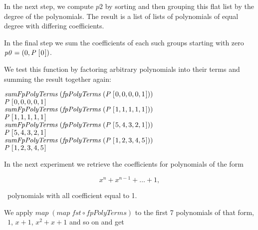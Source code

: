 \documentclass[tikz]{scrreprt}
\newcommand{\Conid}[1]{\mathit{#1}}
\newcommand{\Varid}[1]{\mathit{#1}}
\begin{document}
In the next step, we compute $p2$ by sorting
and then grouping
this flat list by the degree of the polynomials.
The result is a list of lists of polynomials 
of equal degree with
differing coefficients.

In the final step we sum the coefficients of
each such groups starting with zero
\ensuremath{\Varid{p0}\mathrel{=}(\mathrm{0},\Conid{P}\;[\mskip1.5mu \mathrm{0}\mskip1.5mu])}. 

We test this function by factoring
arbitrary polynomials into their terms and
summing the result together again:

\begin{minipage}{\textwidth}
\ensuremath{\Varid{sumFpPolyTerms}\;(\Varid{fpPolyTerms}\;(\Conid{P}\;[\mskip1.5mu \mathrm{0},\mathrm{0},\mathrm{0},\mathrm{0},\mathrm{1}\mskip1.5mu]))}\\
\ensuremath{\Conid{P}\;[\mskip1.5mu \mathrm{0},\mathrm{0},\mathrm{0},\mathrm{0},\mathrm{1}\mskip1.5mu]}\\
\ensuremath{\Varid{sumFpPolyTerms}\;(\Varid{fpPolyTerms}\;(\Conid{P}\;[\mskip1.5mu \mathrm{1},\mathrm{1},\mathrm{1},\mathrm{1},\mathrm{1}\mskip1.5mu]))}\\
\ensuremath{\Conid{P}\;[\mskip1.5mu \mathrm{1},\mathrm{1},\mathrm{1},\mathrm{1},\mathrm{1}\mskip1.5mu]}\\
\ensuremath{\Varid{sumFpPolyTerms}\;(\Varid{fpPolyTerms}\;(\Conid{P}\;[\mskip1.5mu \mathrm{5},\mathrm{4},\mathrm{3},\mathrm{2},\mathrm{1}\mskip1.5mu]))}\\
\ensuremath{\Conid{P}\;[\mskip1.5mu \mathrm{5},\mathrm{4},\mathrm{3},\mathrm{2},\mathrm{1}\mskip1.5mu]}\\
\ensuremath{\Varid{sumFpPolyTerms}\;(\Varid{fpPolyTerms}\;(\Conid{P}\;[\mskip1.5mu \mathrm{1},\mathrm{2},\mathrm{3},\mathrm{4},\mathrm{5}\mskip1.5mu]))}\\
\ensuremath{\Conid{P}\;[\mskip1.5mu \mathrm{1},\mathrm{2},\mathrm{3},\mathrm{4},\mathrm{5}\mskip1.5mu]}
\end{minipage}

In the next experiment we retrieve the coefficients
for polynomials of the form 

\[
x^n + x^{n-1} + \dots + 1,
\]

\ie\ polynomials with all coefficient equal to 1.

We apply
\ensuremath{\Varid{map}\;(\Varid{map}\;\Varid{fst}\mathbin{\circ}\Varid{fpPolyTerms})}
to the first 7 polynomials of that form,
\ie\ $1$, $x + 1$, $x^2 + x + 1$ and so on
and get
\end{document}
